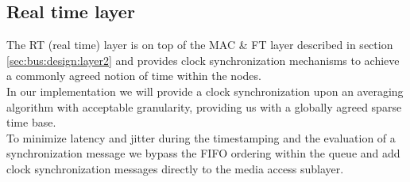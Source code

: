 \subsection{Real time layer}
\label{sec:bus:design:layer3}
\label{sec:bus:design:layer6}
The RT (real time) layer is on top of the MAC \& FT layer described in section \ref{sec:bus:design:layer2} and provides clock synchronization mechanisms to achieve a commonly agreed notion of time within the nodes.\\

In our implementation we will provide a clock synchronization upon an averaging algorithm with acceptable granularity, providing us with a globally agreed sparse time base.\\

To minimize latency and jitter during the timestamping and the evaluation of a synchronization message we bypass the FIFO ordering within the queue and add clock synchronization messages directly to the media access sublayer.\\